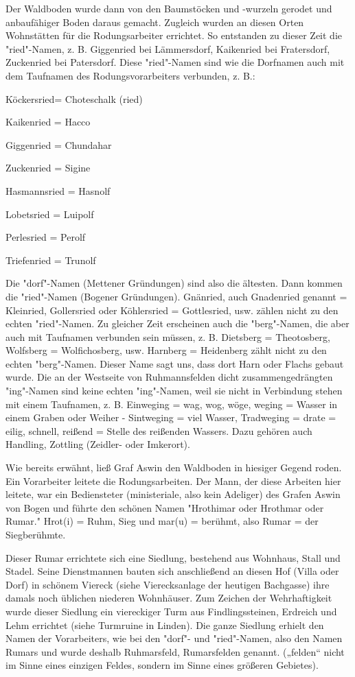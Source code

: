 Der Waldboden wurde dann von den Baumstöcken und -wurzeln gerodet und
anbaufähiger Boden daraus gemacht. Zugleich wurden an diesen Orten Wohnstätten
für die Rodungsarbeiter errichtet. So entstanden zu dieser Zeit die
"ried"-Namen, z. B. Giggenried bei Lämmersdorf, Kaikenried bei Fratersdorf,
Zuckenried bei Patersdorf. Diese "ried"-Namen sind wie die Dorfnamen auch mit
dem Taufnamen des Rodungsvorarbeiters verbunden, z. B.:



Köckersried= Choteschalk (ried)

Kaikenried = Hacco

Giggenried = Chundahar

Zuckenried = Sigine

Hasmannsried = Hasnolf

Lobetsried = Luipolf

Perlesried = Perolf

Triefenried = Trunolf

Die "dorf"-Namen (Mettener Gründungen) sind also die ältesten. Dann kommen die
"ried"-Namen (Bogener Gründungen). Gnänried, auch Gnadenried genannt =
Kleinried, Gollersried oder Köhlersried = Gottlesried, usw. zählen nicht zu den
echten "ried"-Namen. Zu gleicher Zeit erscheinen auch die "berg"-Namen, die aber
auch mit Taufnamen verbunden sein müssen, z. B. Dietsberg = Theotosberg,
Wolfsberg = Wolfichosberg, usw. Harnberg = Heidenberg zählt nicht zu den echten
"berg"-Namen. Dieser Name sagt uns, dass dort Harn oder Flachs gebaut wurde. Die
an der Westseite von Ruhmannsfelden dicht zusammengedrängten "ing"-Namen sind
keine echten "ing"-Namen, weil sie nicht in Verbindung stehen mit einem
Taufnamen, z. B. Einweging = wag, wog, wöge, weging = Wasser in einem Graben
oder Weiher - Sintweging = viel Wasser, Tradweging = drate = eilig, schnell,
reißend = Stelle des reißenden Wassers. Dazu gehören auch Handling, Zottling
(Zeidler- oder Imkerort).

Wie bereits erwähnt, ließ Graf Aswin den Waldboden in hiesiger Gegend roden. Ein
Vorarbeiter leitete die Rodungsarbeiten. Der Mann, der diese Arbeiten hier
leitete, war ein Bediensteter (ministeriale, also kein Adeliger) des Grafen
Aswin von Bogen und führte den schönen Namen "Hrothimar oder Hrothmar oder
Rumar." Hrot(i) = Ruhm, Sieg und mar(u) = berühmt, also Rumar = der
Siegberühmte.

Dieser Rumar errichtete sich eine Siedlung, bestehend aus Wohnhaus, Stall und
Stadel. Seine Dienstmannen bauten sich anschließend an diesen Hof (Villa oder
Dorf) in schönem Viereck (siehe Vierecksanlage der heutigen Bachgasse) ihre
damals noch üblichen niederen Wohnhäuser. Zum Zeichen der Wehrhaftigkeit wurde
dieser Siedlung ein viereckiger Turm aus Findlingssteinen, Erdreich und Lehm
errichtet (siehe Turmruine in Linden). Die ganze Siedlung erhielt den Namen der
Vorarbeiters, wie bei den "dorf"- und "ried"-Namen, also den Namen Rumars und
wurde deshalb Ruhmarsfeld, Rumarsfelden genannt. („felden“ nicht im Sinne eines
einzigen Feldes, sondern im Sinne eines größeren Gebietes).

